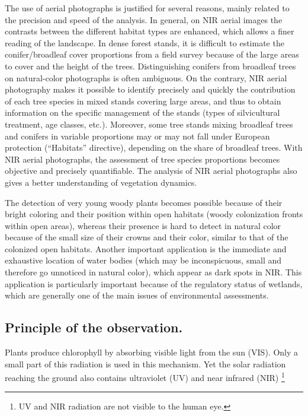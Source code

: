 \documentclass[a4paper,11pt]{report}
\begin{document}
The use of aerial photographs is justified for several reasons, mainly related to the precision and speed of the analysis.
In general, on NIR aerial images the contrasts between the different habitat types are enhanced, which allows a finer reading of the landscape.
In dense forest stands, it is difficult to estimate the conifer/broadleaf cover proportions from a field survey because of the large areas to cover and the height of the trees.
Distinguishing conifers from broadleaf trees on natural-color photographs is often ambiguous.
On the contrary, NIR aerial photography makes it possible to identify precisely and quickly the contribution of each tree species in mixed stands covering large areas, and thus to obtain information on the specific management of the stands (types of silvicultural treatment, age classes, etc.).  Moreover, some tree stands mixing broadleaf trees and conifers in variable proportions may or may not fall under European protection (``Habitats'' directive), depending on the share of broadleaf trees.
With NIR aerial photographs, the assessment of tree species proportions becomes objective and precisely quantifiable.
The analysis of NIR aerial photographs also gives a better understanding of vegetation dynamics.

The detection of very young woody plants becomes possible because of their bright coloring and their position within open habitats (woody colonization fronts within open areas), whereas their presence is hard to detect in natural color because of the small size of their crowns and their color, similar to that of the colonized open habitats.
Another important application is the immediate and exhaustive location of water bodies (which may be inconspicuous, small and therefore go unnoticed in natural color), which appear as dark spots  in NIR.
This application is particularly important because of the regulatory status of wetlands, which are generally one of the main issues of environmental assessments.


\subsection{Principle of the observation.}

Plants produce chlorophyll by absorbing visible light from the sun (VIS). Only a small part of this radiation is used in this mechanism. Yet the solar radiation reaching the ground also contains ultraviolet (UV) and near infrared (NIR) \footnote{UV and NIR radiation are not visible to the human eye.}
\end{document}
